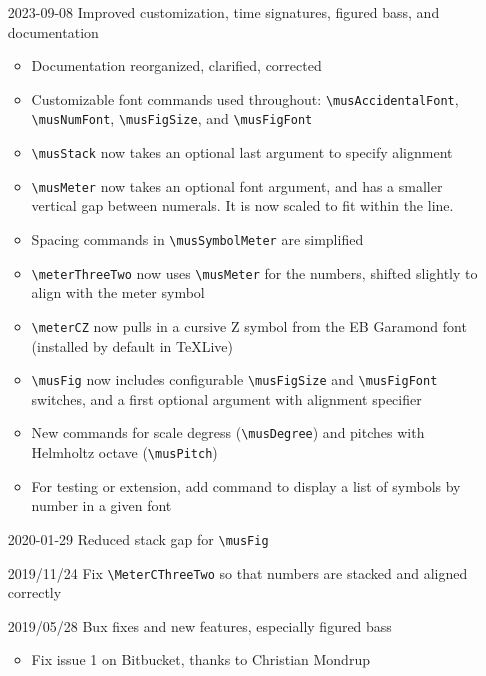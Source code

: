 \documentclass{article}
\begin{document}
\begin{itemize}
    \item[2023-09-08] Improved customization, time signatures, figured bass,
        and documentation
        \begin{itemize}
            \item Documentation reorganized, clarified, corrected
            \item Customizable font commands used throughout:
                \verb|\musAccidentalFont|, \verb|\musNumFont|,
                \verb|\musFigSize|, and \verb|\musFigFont|
            \item \verb|\musStack| now takes an optional last argument to
                specify alignment
            \item \verb|\musMeter| now takes an optional font argument, and
                has a smaller vertical gap between numerals. It is now scaled
                to fit within the line.
            \item Spacing commands in \verb|\musSymbolMeter| are simplified
            \item \verb|\meterThreeTwo| now uses \verb|\musMeter| for the
                numbers, shifted slightly to align with the meter symbol
            \item \verb|\meterCZ| now pulls in a cursive Z symbol from the EB
                Garamond font (installed by default in TeXLive)
            \item \verb|\musFig| now includes configurable \verb|\musFigSize|
                and \verb|\musFigFont| switches, and a first optional argument
                with alignment specifier
            \item New commands for scale degress (\verb|\musDegree|) and
                pitches with Helmholtz octave (\verb|\musPitch|)
            \item For testing or extension, add command to display a list of
                symbols by number in a given font
        \end{itemize}
    \item[2020-01-29] Reduced stack gap for \verb|\musFig|
    \item[2019/11/24] Fix \verb|\MeterCThreeTwo| so that numbers are stacked
        and aligned correctly
    \item[2019/05/28] Bux fixes and new features, especially figured bass
        \begin{itemize}
            \item Fix issue 1 on Bitbucket, thanks to Christian Mondrup

\end{itemize}
\end{itemize}
\end{document}
